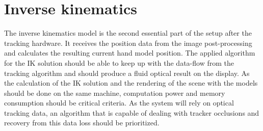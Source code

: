 \section{Inverse kinematics}
The inverse kinematics model is the second essential part of the setup after the tracking hardware. It receives the position data from the image post-processing and calculates the resulting current hand model position. The applied algorithm for the IK solution should be able to keep up with the data-flow from the tracking algorithm and should produce a fluid optical result on the display. As the calculation of the IK solution and the rendering of the scene with the models should be done on the same machine, computation power and memory consumption should be critical criteria. As the system will rely on optical tracking data, an algorithm that is capable of dealing with tracker occlusions and recovery from this data loss should be prioritized.
\newpage

